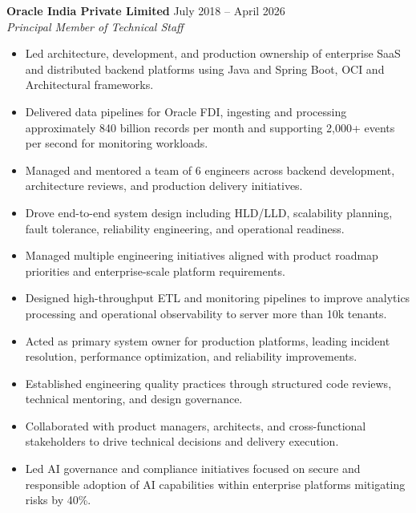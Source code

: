 \documentclass[11pt,a4paper]{article}
\begin{document}
\textbf{Oracle India Private Limited} \hfill July 2018 -- April 2026 \\
\textit{Principal Member of Technical Staff}

\begin{itemize}
    \item Led architecture, development, and production ownership of enterprise SaaS and distributed backend platforms using Java and Spring Boot, OCI and Architectural frameworks.

    \item Delivered data pipelines for Oracle FDI, ingesting and processing approximately 840 billion records per month and supporting 2,000+ events per second for monitoring workloads.
    
    \item Managed and mentored a team of 6 engineers across backend development, architecture reviews, and production delivery initiatives.
    
    \item Drove end-to-end system design including HLD/LLD, scalability planning, fault tolerance, reliability engineering, and operational readiness.
    
    \item Managed multiple engineering initiatives aligned with product roadmap priorities and enterprise-scale platform requirements.
    
    \item Designed high-throughput ETL and monitoring pipelines to improve analytics processing and operational observability to server more than 10k tenants.
    
    \item Acted as primary system owner for production platforms, leading incident resolution, performance optimization, and reliability improvements.
    
    \item Established engineering quality practices through structured code reviews, technical mentoring, and design governance.
    
    \item Collaborated with product managers, architects, and cross-functional stakeholders to drive technical decisions and delivery execution.
    
    \item Led AI governance and compliance initiatives focused on secure and responsible adoption of AI capabilities within enterprise platforms mitigating risks by 40\%.
\end{itemize}
\end{document}
